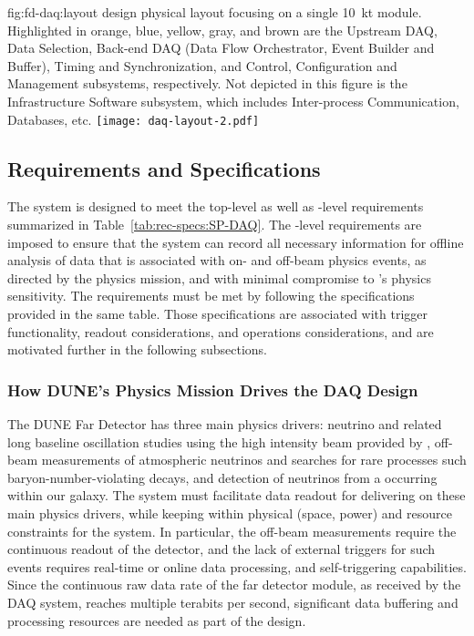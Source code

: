 \begin{dunefigure}{fig:fd-daq:layout}{ design physical
    layout focusing on a single \SI{10}{\kilo\tonne}
    module. Highlighted in orange, blue, yellow, gray, and brown are
    the Upstream DAQ, Data Selection, Back-end DAQ (Data Flow
    Orchestrator, Event Builder and Buffer), Timing and
    Synchronization, and Control,
    Configuration and Management subsystems, respectively. Not depicted in this figure
    is the Infrastructure Software subsystem, which includes Inter-process
    Communication, Databases, etc.
  }
  \texttt{[image: daq-layout-2.pdf]}
\end{dunefigure}


\subsection{Requirements and Specifications}
\label{sec:fd-daq:requirements}

The    system is designed to meet the
 top-level as well as -level requirements
summarized in Table~\ref{tab:rec-specs:SP-DAQ}. The -level requirements are
imposed to ensure that the 
system %
can record all necessary information for offline 
analysis of data that is associated with on- and off-beam physics events, as directed
by the  physics mission, and with minimal compromise to
's physics sensitivity. The requirements must be met by following the 
specifications provided in the same table. Those specifications are
associated with trigger functionality, readout considerations,
and operations considerations, and are motivated further in the following subsections.

\subsubsection{How DUNE's Physics Mission Drives the DAQ Design}

The DUNE Far Detector has three main physics drivers: neutrino  and related
long baseline oscillation studies using the high intensity beam provided
by \fnal, off-beam measurements of atmospheric neutrinos and searches
for rare processes such baryon-number-violating decays,
and detection of neutrinos from a  occurring within our galaxy. The
   system must facilitate data
readout for delivering on these main physics drivers, while keeping
within physical (space, power) and resource constraints for
the system. In particular, the off-beam measurements require the
continuous readout of the detector, and the lack of external triggers for such
events requires real-time or online data processing, and
self-triggering capabilities. Since the
continuous raw data rate of the far detector module, as received by
the DAQ system, reaches multiple
terabits per second, significant data buffering and processing
resources are needed as part of the design.

